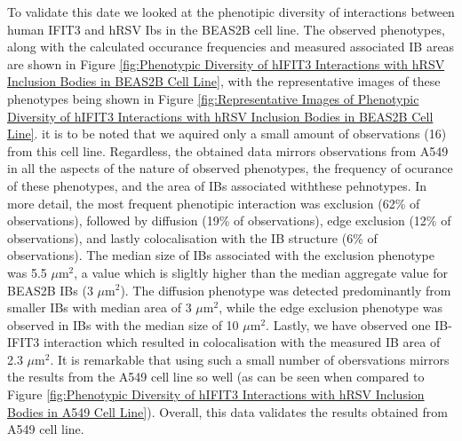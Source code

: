 To validate this date we looked at the phenotipic diversity of interactions between human IFIT3 and hRSV Ibs in the BEAS2B cell line. The observed phenotypes, along with the calculated occurance frequencies and measured associated IB areas are shown in Figure \ref{fig:Phenotypic Diversity of hIFIT3 Interactions with hRSV Inclusion Bodies in BEAS2B Cell Line}, with the representative images of these phenotypes being shown in Figure \ref{fig:Representative Images of Phenotypic Diversity of hIFIT3 Interactions with hRSV Inclusion Bodies in BEAS2B Cell Line}. it is to be noted that we aquired only a small amount of observations (16) from this cell line. Regardless, the obtained data mirrors observations from A549 in all the aspects of the nature of observed phenotypes, the frequency of ocurance of these phenotypes, and the area of IBs associated withthese pehnotypes. In more detail, the most frequent phenotipic interaction was exclusion (62\% of observations), followed by diffusion (19\% of observations), edge exclusion (12\% of observations), and lastly colocalisation with the IB structure (6\% of observations). The median size of IBs associated with the exclusion phenotype was 5.5 \(\mu \mbox{m}^2\), a value which is sligltly higher than the median aggregate value for BEAS2B IBs (3 \(\mu \mbox{m}^2\)). The diffusion phenotype was detected predominantly from smaller IBs with median area of 3 \(\mu \mbox{m}^2\), while the edge exclusion phenotype was observed in IBs with the median size of 10 \(\mu \mbox{m}^2\). Lastly, we have observed one IB-IFIT3 interaction which resulted in colocalisation with the measured IB area of 2.3 \(\mu \mbox{m}^2\). It is remarkable that using such a small number of obersvations mirrors the results from the A549 cell line so well (as can be seen when compared to Figure \ref{fig:Phenotypic Diversity of hIFIT3 Interactions with hRSV Inclusion Bodies in A549 Cell Line}). Overall, this data validates the results obtained from A549 cell line.

